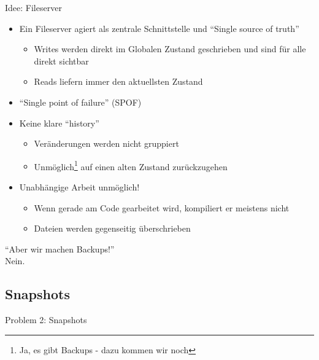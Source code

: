 \begin{frame}
    \slidehead
    \vspace{-1em}
    Idee: Fileserver
    \begin{itemize}
        [<+->]
        \item Ein Fileserver agiert als zentrale Schnittstelle und \enquote{Single source of truth}
        \begin{itemize}
            \item Writes werden direkt im Globalen Zustand geschrieben und sind für alle direkt sichtbar
            \item Reads liefern immer den aktuellsten Zustand
        \end{itemize}
        \item \enquote{Single point of failure} (SPOF)
        \item Keine klare \enquote{history}
        \begin{itemize}
            \item Veränderungen werden nicht gruppiert
            \item Unmöglich\footnote{Ja, es gibt Backups - dazu kommen wir noch} auf einen alten Zustand zurückzugehen
        \end{itemize}
        \item Unabhängige Arbeit unmöglich!
        \begin{itemize}
            \item Wenn gerade am Code gearbeitet wird, kompiliert er meistens nicht
            \item Dateien werden gegenseitig überschrieben
        \end{itemize}
    \end{itemize}
\end{frame}

\begin{frame}[c]
    \slidehead
    \Large
    \centering
    \enquote{Aber wir machen Backups!}
    \pause
    \\
    \vspace{1em}
    \textcolor{red!90}{Nein.}
\end{frame}

\subsection{Snapshots}\label{subsec:snapshots}

\begin{frame}[c]
    \slidehead
    \centering
    \Large
    Problem 2: Snapshots
\end{frame}

